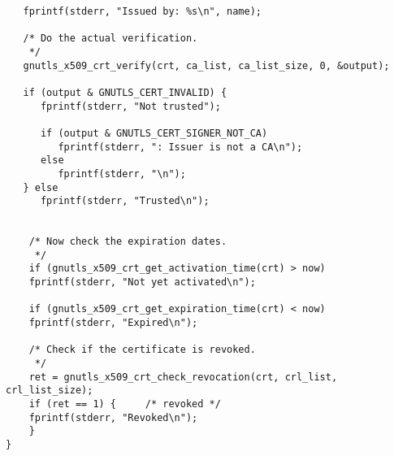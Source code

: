 \begin{verbatim}
   fprintf(stderr, "Issued by: %s\n", name);

   /* Do the actual verification.
    */
   gnutls_x509_crt_verify(crt, ca_list, ca_list_size, 0, &output);

   if (output & GNUTLS_CERT_INVALID) {
      fprintf(stderr, "Not trusted");

      if (output & GNUTLS_CERT_SIGNER_NOT_CA)
         fprintf(stderr, ": Issuer is not a CA\n");
      else
         fprintf(stderr, "\n");
   } else
      fprintf(stderr, "Trusted\n");


    /* Now check the expiration dates.
     */
    if (gnutls_x509_crt_get_activation_time(crt) > now)
	fprintf(stderr, "Not yet activated\n");

    if (gnutls_x509_crt_get_expiration_time(crt) < now)
	fprintf(stderr, "Expired\n");

    /* Check if the certificate is revoked.
     */
    ret = gnutls_x509_crt_check_revocation(crt, crl_list, crl_list_size);
    if (ret == 1) {		/* revoked */
	fprintf(stderr, "Revoked\n");
    }
}

\end{verbatim}

